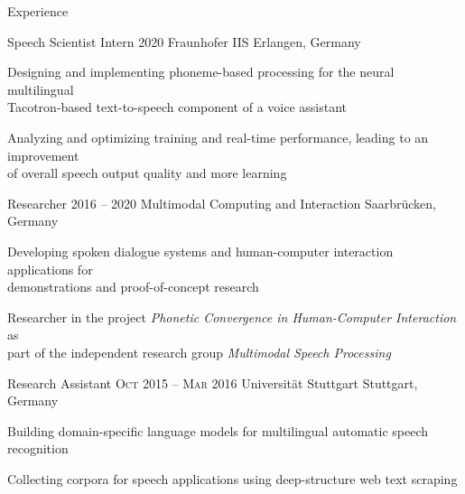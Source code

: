 \documentclass{resume} %
\begin{document}
\begin{rSection}{Experience}

\begin{rSubsection}
	{Speech Scientist Intern}
	{2020}
	{Fraunhofer IIS}
	{Erlangen, Germany}
	
	\setlength{\itemindent}{.7cm}
	
	\item Designing and implementing phoneme-based processing for the neural multilingual\\\hspace*{.7cm}Tacotron-based text-to-speech component of a voice assistant
	\item Analyzing and optimizing training and real-time performance, leading to an improvement\\\hspace*{.7cm}of overall speech output quality and more learning
\end{rSubsection}

\begin{rSubsection}
	{Researcher}
	{2016 -- 2020}
	{Multimodal Computing and Interaction}
	{Saarbrücken, Germany}
	
	\setlength{\itemindent}{.7cm}
	
	\item Developing spoken dialogue systems and human-computer interaction applications for\\\hspace*{.7cm}demonstrations and proof-of-concept research
	\item Researcher in the project \textit{Phonetic Convergence in Human-Computer Interaction} as\\\hspace*{.7cm}part of the independent research group \textit{Multimodal Speech Processing}
\end{rSubsection}

\begin{rSubsection}
	{Research Assistant}
	{\textsc{Oct} 2015 -- \textsc{Mar} 2016}
	{Universität Stuttgart}
	{Stuttgart, Germany}
	
	\setlength{\itemindent}{.7cm}
	
	\item Building domain-specific language models for multilingual automatic speech recognition
	\item Collecting corpora for speech applications using deep-structure web text scraping
\end{rSubsection}


\end{rSection}
\end{document}
